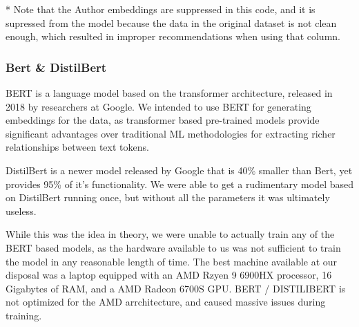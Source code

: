 * Note that the Author embeddings are suppressed in this code, and it is supressed from the model because the data in the original dataset is not clean enough, which resulted in improper recommendations when using that column.

\subsubsection*{Bert \& DistilBert}
BERT is a language model based on the transformer architecture, released in 2018 by researchers at Google. We intended to use BERT for generating embeddings for the data, as transformer based pre-trained models provide significant advantages over traditional ML methodologies for extracting richer relationships between text tokens.

DistilBert is a newer model released by Google that is 40\% smaller than Bert, yet provides 95\% of it's functionality. We were able to get a rudimentary model based on DistilBert running once, but without all the parameters it was ultimately useless.

While this was the idea in theory, we were unable to actually train any of the
BERT based models, as the hardware available to us was not sufficient to train
the model in any reasonable length of time. The best machine available at our
disposal was a laptop equipped with an AMD Rzyen 9 6900HX processor, 16
Gigabytes of RAM, and a AMD Radeon 6700S GPU. BERT / DISTILIBERT is not
optimized for the AMD arrchitecture, and caused massive issues during training.

